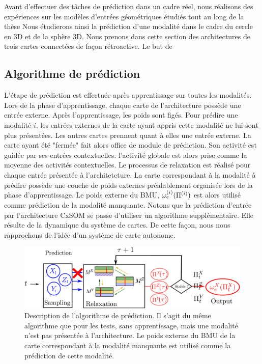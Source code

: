 Avant d'effectuer des tâches de prédiction dans un cadre réel, nous réalisons des expériences sur les modèles d'entrées géométriques étudiés tout au long de la thèse
Nous étudierons ainsi la prédiction d'une modalité dans le cadre du cercle en 3D et de la sphère 3D. 
Nous prenons dans cette section des architectures de trois cartes connectées de façon rétroactive. 
Le but de 

\subsection{Algorithme de prédiction}

L'étape de prédiction est effectuée après apprentissage sur toutes les modalités.
Lors de la phase d'apprentissage, chaque carte de l'architecture possède une entrée externe. Après l'apprentissage, les poids sont figés.
Pour prédire une modalité $i$, les entrées externes de la carte ayant appris cette modalité ne lui sont plus présentées. Les autres cartes prennent quant à elles une entrée externe.
La carte ayant été "fermée" fait alors office de module de prédiction. Son activité est guidée par ses entrées contextuelles: l'activité globale est alors prise comme la moyenne des activités contextuelles. Le processus de relaxation est réalisé pour chaque entrée présentée à l'architetcture.
La carte correspondant à la modalité à prédire possède une couche de poids externes préalablement organisée lors de la phase d'apprentissage. Le poids externe du BMU, $\omega_{e}^{({i})}(\Pi^{({i})})$ est alors utilisé comme prédiction de la modalité manquante. 
Notons que la prédiction d'entrée par l'architecture CxSOM se passe d'utiliser un algorithme supplémentaire. Elle résulte de la dynamique du système de cartes. De cette façon, nous nous rapprochons de l'idée d'un système de carte autonome.

\begin{figure}
\centering
\includegraphics[width=\textwidth]{prediction_setup}
\caption{Description de l'algorithme de prédiction. Il s'agit du même algorithme que pour les tests, sans apprentissage, mais une modalité n'est pas présentée à l'architecture. Le poids externe du BMU de la carte correspondant à la modalité manquante est utilisé comme la prédiction de cette modalité.}
\label{fig:schema}
\end{figure}



